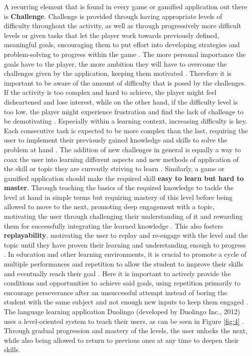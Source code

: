 A recurring element that is found in every game or gamified application out there is \textbf{Challenge}. Challenge is provided through having appropriate levels of difficulty throughout the activity, as well as through progressively more difficult levels or given tasks that let the player work towards previously defined, meaningful goals, encouraging them to put effort into developing strategies and problem-solving to progress within the game \cite{aspects} \cite{engage} \cite{edu} \cite{fail}. The more personal importance the goals have to the player, the more ambition they will have to overcome the challenges given by the application, keeping them motivated \cite{model}. Therefore it is important to be aware of the amount of difficulty that is posed by the challenges. If the activity is too complex and hard to achieve, the player might feel disheartened and lose interest, while on the other hand, if the difficulty level is too low, the player might experience frustration and find the lack of challenge to be demotivating \cite{aspects}.
Especially within a learning context, increasing difficulty is key. Each consecutive task is expected to be more complex than the last, requiring the user to implement their previously gained knowledge and skills to solve the problem at hand \cite{edu}. The addition of new challenges in general is equally a way to coax the user into learning different aspects and new methods of application of the skill or topic they are currently striving to learn \cite{higher}.
Similarly, a game or gamified application should make the required skill \textbf{easy to learn but hard to master}. Through teaching the basics of the required knowledge to tackle the level at hand in simple terms but requiring mastery of this level before being allowed to move to the next, promoting deep engagement with a topic, motivating the user through challenging their understanding of it and rewarding them for successfully integrating the learned knowledge \cite{higher}.
This also fosters \textbf{replayability}, motivating the user to replay and re-engage with the level and the topic until they have proven their learning and understanding enough to progress \cite{fail}. In education and other learning environments, it is crucial to promote a cycle of multiple performances and repetition to allow the student to improve their skills and eventually reach their goal \cite{edu}. Here it is important to actively provide the conditions and opportunities to achieve said goals, using repetition primarily to encourage perseverance after an unsuccessful attempt instead of boring the student with the same subject and not enough new inputs to keep them engaged \cite{edu}. The language learning application Duolingo (developed by Duolingo Inc., 2012) uses a level-oriented system to teach their users, as can be seen in Figure \ref{fig:4} \cite{level}. Through gradual progression and mastery of the levels, the user unlocks the next, while also being allowed to return to previous ones at any time to deepen their skills.

